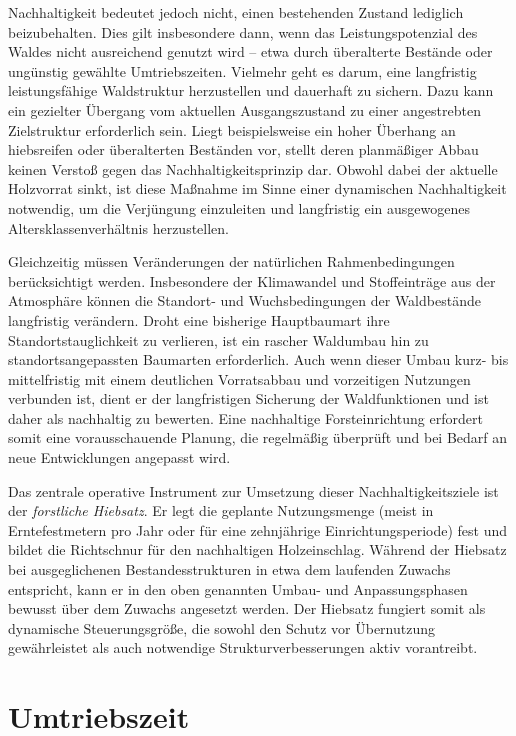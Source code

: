 \documentclass[twocolumn, paper=a4, fontsize=10pt]{scrartcl}
\begin{document}
Nachhaltigkeit bedeutet jedoch nicht, einen bestehenden Zustand lediglich beizubehalten. Dies gilt insbesondere dann, wenn das Leistungspotenzial des Waldes nicht ausreichend genutzt wird -- etwa durch überalterte Bestände oder ungünstig gewählte Umtriebszeiten. Vielmehr geht es darum, eine langfristig leistungsfähige Waldstruktur herzustellen und dauerhaft zu sichern. Dazu kann ein gezielter Übergang vom aktuellen Ausgangszustand zu einer angestrebten Zielstruktur erforderlich sein. Liegt beispielsweise ein hoher Überhang an hiebsreifen oder überalterten Beständen vor, stellt deren planmäßiger Abbau keinen Verstoß gegen das Nachhaltigkeitsprinzip dar. Obwohl dabei der aktuelle Holzvorrat sinkt, ist diese Maßnahme im Sinne einer dynamischen Nachhaltigkeit notwendig, um die Verjüngung einzuleiten und langfristig ein ausgewogenes Altersklassenverhältnis herzustellen.

Gleichzeitig müssen Veränderungen der natürlichen Rahmenbedingungen berücksichtigt werden. Insbesondere der Klimawandel und Stoffeinträge aus der Atmosphäre können die Standort- und Wuchsbedingungen der Waldbestände langfristig verändern. Droht eine bisherige Hauptbaumart ihre Standortstauglichkeit zu verlieren, ist ein rascher Waldumbau hin zu standortsangepassten Baumarten erforderlich. Auch wenn dieser Umbau kurz- bis mittelfristig mit einem deutlichen Vorratsabbau und vorzeitigen Nutzungen verbunden ist, dient er der langfristigen Sicherung der Waldfunktionen und ist daher als nachhaltig zu bewerten. Eine nachhaltige Forsteinrichtung erfordert somit eine vorausschauende Planung, die regelmäßig überprüft und bei Bedarf an neue Entwicklungen angepasst wird.

Das zentrale operative Instrument zur Umsetzung dieser Nachhaltigkeitsziele ist der \emph{forstliche Hiebsatz}. Er legt die geplante Nutzungsmenge (meist in Erntefestmetern pro Jahr oder für eine zehnjährige Einrichtungsperiode) fest und bildet die Richtschnur für den nachhaltigen Holzeinschlag. Während der Hiebsatz bei ausgeglichenen Bestandesstrukturen in etwa dem laufenden Zuwachs entspricht, kann er in den oben genannten Umbau- und Anpassungsphasen bewusst über dem Zuwachs angesetzt werden. Der Hiebsatz fungiert somit als dynamische Steuerungsgröße, die sowohl den Schutz vor Übernutzung gewährleistet als auch notwendige Strukturverbesserungen aktiv vorantreibt.

\section{Umtriebszeit}
\end{document}

